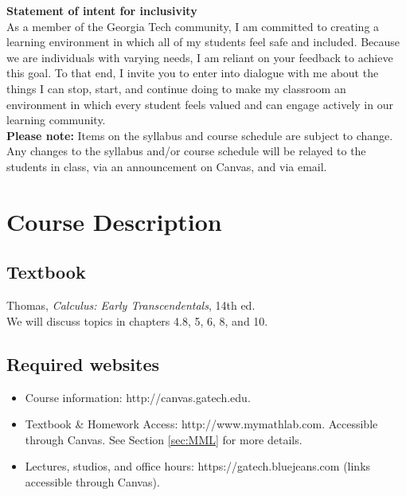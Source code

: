 \documentclass[11pt]{article}
\begin{document}
{\bf{Statement of intent for inclusivity}}\\

As a member of the Georgia Tech community, I am committed to creating a learning environment in which all of my students feel safe and included.  Because we are individuals with varying needs, I am reliant on your feedback to achieve this goal.  To that end, I invite you to enter into dialogue with me about the things I can stop, start, and continue doing to make my classroom an environment in which every student feels valued and can engage actively in our learning community.\\

{\bf Please note:} Items on the syllabus and course schedule are subject to change. Any changes to the syllabus and/or course schedule will be relayed to the students in class, via an announcement on Canvas, and via email.

\tableofcontents

\newpage
\section{Course Description}

\subsection{Textbook}
Thomas, {\em Calculus: Early Transcendentals}, 14th ed.\\
We will discuss topics in chapters 4.8, 5, 6, 8, and 10.

\subsection{Required websites}
\begin{itemize}
    \item Course information: http://canvas.gatech.edu.
    \item Textbook \& Homework Access: http://www.mymathlab.com. Accessible through Canvas. See Section \ref{sec:MML} for more details.
    \item Lectures, studios, and office hours: https://gatech.bluejeans.com (links accessible through Canvas).
\end{itemize}
\end{document}

